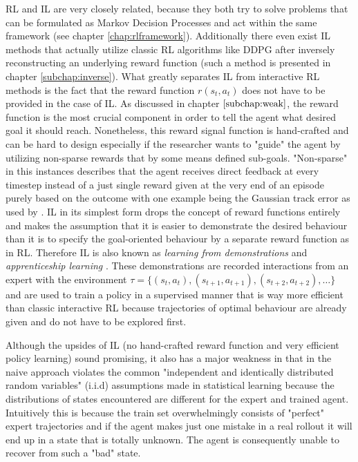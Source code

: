 \par
RL and IL are very closely related, because they both try to solve problems that can be formulated as Markov Decision Processes and act within the same framework (see chapter \ref{chap:rlframework}). Additionally there even exist IL methods that actually utilize classic RL algorithms like DDPG after inversely reconstructing an underlying reward function (such a method is presented in chapter \ref{subchap:inverse}). What greatly separates IL from interactive RL methods is the fact that the reward function $r(s_t, a_t)$ does not have to be provided in the case of IL. As discussed in chapter $\ref{subchap:weak}$, the reward function is the most crucial component in order to tell the agent what desired goal it should reach. Nonetheless, this reward signal function is hand-crafted and can be hard to design especially if the researcher wants to "guide" the agent by utilizing non-sparse rewards  that by some means defined sub-goals. "Non-sparse" in this instances describes that the agent receives direct feedback at every timestep instead of a just single reward given at the very end of an episode purely based on the outcome with one example being the Gaussian track error as used by \cite{martinsen2018curved}.
IL in its simplest form drops the concept of reward functions entirely and makes the assumption that it is easier to demonstrate the desired behaviour than it is to specify the goal-oriented behaviour by a separate reward function as in RL. Therefore IL is also known as \textit{learning from demonstrations} and \textit{apprenticeship learning} \cite[p.~470]{Sutton1998}. These demonstrations are recorded interactions from an expert with the environment $\tau = \{(s_t, a_t), (s_{t+1}, a_{t+1}), (s_{t+2}, a_{t+2}), \dots\}$ and are used to train a policy in a supervised manner that is way more efficient than classic interactive RL because trajectories of optimal behaviour are already given and do not have to be explored first.
\par
Although the upsides of IL (no hand-crafted reward function and very efficient policy learning) sound promising, it also has a major weakness in that in the naive approach violates the common "independent and identically distributed random variables" (i.i.d) assumptions made in statistical learning \cite{ross2011reduction} because the distributions of states encountered are different for the expert and trained agent. Intuitively this is because the train set overwhelmingly consists of "perfect" expert trajectories and if the agent makes just one mistake in a real rollout it will end up in a state that is totally unknown. The agent is consequently unable to recover from such a "bad" state.


